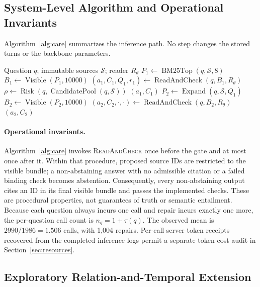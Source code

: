 \documentclass[11pt]{article}
\newcommand{\care}{\textsc{CARE}}
\newcommand{\botans}{\bot}
\newcommand{\sources}{\mathcal{S}}
\begin{document}
\subsection{System-Level Algorithm and Operational Invariants}

Algorithm~\ref{alg:care} summarizes the inference path. No step changes the
stored turns or the backbone parameters.

\begin{algorithm}[t]
\caption{\care{} answer-time inference for one question}
\label{alg:care}
\begin{algorithmic}[1]
\Require Question $q$; immutable sources $\sources$; reader $R_\theta$
\State $P_1 \gets \operatorname{BM25Top}(q,\sources,8)$
\State $B_1 \gets \operatorname{Visible}(P_1,10000)$
\State $(a_1,C_1,Q_1,r_1) \gets \operatorname{ReadAndCheck}(q,B_1,R_\theta)$
\State $\rho \gets \operatorname{Risk}(q,\operatorname{CandidatePool}(q,\sources))$
\If{$\neg r_1 \land \neg(a_1=\botans \land (Q_1\neq\varnothing \lor \rho))$}
  \State \Return $(a_1,C_1)$
\EndIf
\State $P_2 \gets \operatorname{Expand}(q,\sources,Q_1)$ 
\State $B_2 \gets \operatorname{Visible}(P_2,10000)$
\State $(a_2,C_2,\cdot,\cdot) \gets \operatorname{ReadAndCheck}(q,B_2,R_\theta)$
\State \Return $(a_2,C_2)$
\end{algorithmic}
\end{algorithm}

\paragraph{Operational invariants.}
Algorithm~\ref{alg:care} invokes \textsc{ReadAndCheck} once before the gate
and at most once after it. Within that procedure, proposed source IDs are
restricted to the visible bundle; a non-abstaining answer with no admissible
citation or a failed binding check becomes abstention. Consequently, every
non-abstaining output cites an ID in its final visible bundle and passes the
implemented checks. These are procedural properties, not guarantees of truth
or semantic entailment.
Because each question always incurs one call and repair incurs exactly one
more, the per-question call count is $n_q=1+\tau(q)$. The observed mean is
$2990/1986=1.506$ calls, with 1,004 repairs. Per-call server token
receipts recovered from the completed inference logs permit a separate
token-cost audit in Section~\ref{sec:resources}.

\subsection{Exploratory Relation-and-Temporal Extension}
\end{document}
